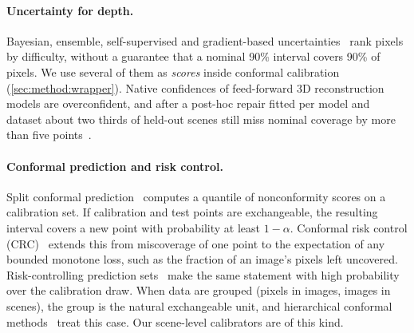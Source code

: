\paragraph{Uncertainty for depth.}
Bayesian, ensemble, self-supervised and gradient-based uncertainties~\cite{kendall2017uncertainties,lakshminarayanan2017ensembles,poggi2020uncertainty,hornauer2022gradient} rank pixels by difficulty, without a guarantee that a nominal 90\% interval covers 90\% of pixels.
We use several of them as \emph{scores} inside conformal calibration (\cref{sec:method:wrapper}).
Native confidences of feed-forward 3D reconstruction models are overconfident, and after a post-hoc repair fitted per model and dataset about two thirds of held-out scenes still miss nominal coverage by more than five points~\cite{deng2026calibrationaudit}.

\paragraph{Conformal prediction and risk control.}
Split conformal prediction~\cite{vovk2005alrw,lei2018distribution,angelopoulos2023gentle} computes a quantile of nonconformity scores on a calibration set.
If calibration and test points are exchangeable, the resulting interval covers a new point with probability at least $1-\alpha$.
Conformal risk control (CRC)~\cite{angelopoulos2024crc} extends this from miscoverage of one point to the expectation of any bounded monotone loss, such as the fraction of an image's pixels left uncovered.
Risk-controlling prediction sets~\cite{bates2021rcps} make the same statement with high probability over the calibration draw.
When data are grouped (pixels in images, images in scenes), the group is the natural exchangeable unit, and hierarchical conformal methods~\cite{dunn2023hierarchical} treat this case.
Our scene-level calibrators are of this kind.

